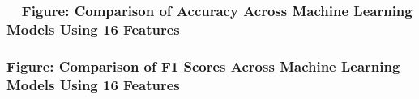 \documentclass[letterpaper]{article}
\begin{document}
\subsubsection[\ \ Figure: Comparison of Accuracy Across Machine Learning Models Using 16 Features]{\ \ \textbf{Figure:}
Comparison of Accuracy Across Machine Learning Models Using 16 Features}

\bigskip


\bigskip


\bigskip


\bigskip

\centering
{}
\par

\bigskip

\subsubsection[Figure: Comparison of F1 Scores Across Machine Learning Models Using 16 Features]{\textbf{Figure:}
Comparison of F1 Scores Across Machine Learning Models Using 16 Features}

\bigskip


\bigskip


\bigskip


\bigskip


\bigskip
\end{document}
